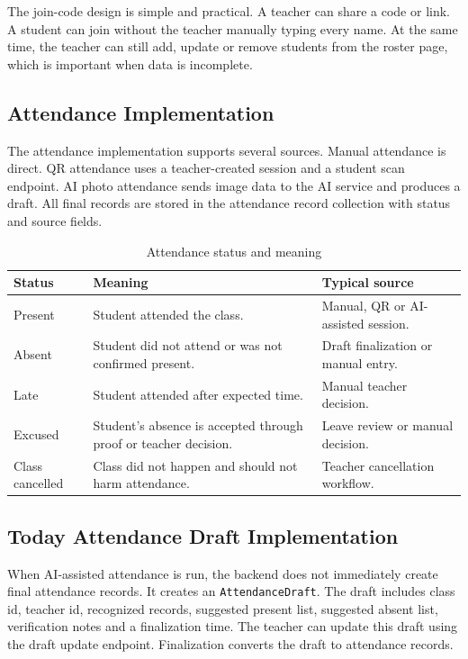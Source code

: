The join-code design is simple and practical. A teacher can share a code or link. A student can join without the teacher manually typing every name. At the same time, the teacher can still add, update or remove students from the roster page, which is important when data is incomplete.

\subsection{Attendance Implementation}

The attendance implementation supports several sources. Manual attendance is direct. QR attendance uses a teacher-created session and a student scan endpoint. AI photo attendance sends image data to the AI service and produces a draft. All final records are stored in the attendance record collection with status and source fields.

\begin{table}[H]
\centering
\caption{Attendance status and meaning}
\label{tab:attendance-status}
\begin{tabularx}{\textwidth}{p{3cm} X X}
\toprule
\textbf{Status} & \textbf{Meaning} & \textbf{Typical source}\\
\midrule
Present & Student attended the class. & Manual, QR or AI-assisted session.\\
Absent & Student did not attend or was not confirmed present. & Draft finalization or manual entry.\\
Late & Student attended after expected time. & Manual teacher decision.\\
Excused & Student's absence is accepted through proof or teacher decision. & Leave review or manual decision.\\
Class cancelled & Class did not happen and should not harm attendance. & Teacher cancellation workflow.\\
\bottomrule
\end{tabularx}
\end{table}

\subsection{Today Attendance Draft Implementation}

When AI-assisted attendance is run, the backend does not immediately create final attendance records. It creates an \texttt{AttendanceDraft}. The draft includes class id, teacher id, recognized records, suggested present list, suggested absent list, verification notes and a finalization time. The teacher can update this draft using the draft update endpoint. Finalization converts the draft to attendance records.

